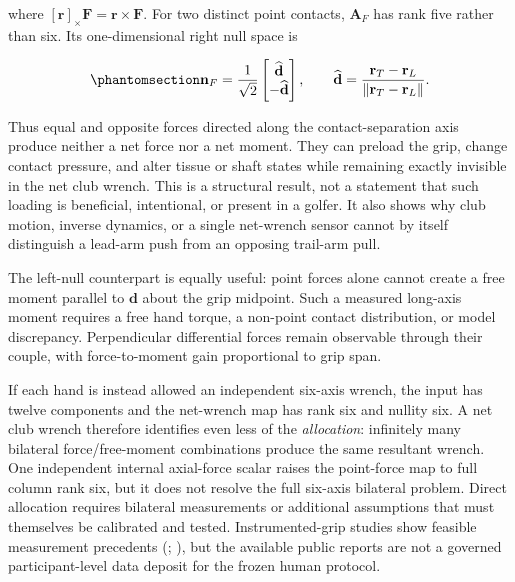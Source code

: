 \documentclass[
  letterpaper,
]{report}
\begin{document}
where \([\mathbf r]_\times\mathbf F=\mathbf r\times\mathbf F\). For two
distinct point contacts, \(\mathbf A_F\) has rank five rather than six.
Its one-dimensional right null space is

\begin{equation}\phantomsection\label{eq-axial-internal-null-mode}{
\mathbf n_F=\frac{1}{\sqrt{2}}
\begin{bmatrix}\widehat{\mathbf d}\\-\widehat{\mathbf d}\end{bmatrix},
\qquad
\widehat{\mathbf d}=\frac{\mathbf r_T-\mathbf r_L}
{\lVert\mathbf r_T-\mathbf r_L\rVert}.
}\end{equation}

Thus equal and opposite forces directed along the contact-separation
axis produce neither a net force nor a net moment. They can preload the
grip, change contact pressure, and alter tissue or shaft states while
remaining exactly invisible in the net club wrench. This is a structural
result, not a statement that such loading is beneficial, intentional, or
present in a golfer. It also shows why club motion, inverse dynamics, or
a single net-wrench sensor cannot by itself distinguish a lead-arm push
from an opposing trail-arm pull.

The left-null counterpart is equally useful: point forces alone cannot
create a free moment parallel to \(\mathbf d\) about the grip midpoint.
Such a measured long-axis moment requires a free hand torque, a
non-point contact distribution, or model discrepancy. Perpendicular
differential forces remain observable through their couple, with
force-to-moment gain proportional to grip span.

If each hand is instead allowed an independent six-axis wrench, the
input has twelve components and the net-wrench map has rank six and
nullity six. A net club wrench therefore identifies even less of the
\emph{allocation}: infinitely many bilateral force/free-moment
combinations produce the same resultant wrench. One independent internal
axial-force scalar raises the point-force map to full column rank six,
but it does not resolve the full six-axis bilateral problem. Direct
allocation requires bilateral measurements or additional assumptions
that must themselves be calibrated and tested. Instrumented-grip studies
show feasible measurement precedents (; ), but the available
public reports are not a governed participant-level data deposit for the
frozen human protocol.
\end{document}
